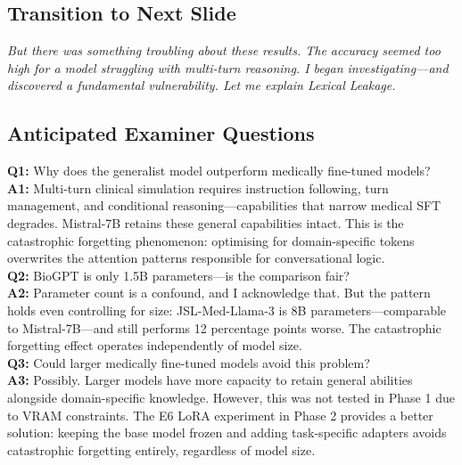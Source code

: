 \documentclass[12pt]{article}
\begin{document}
  \subsection*{Transition to Next Slide}
  {\color{transgreen}
  \textit{But there was something troubling about these results. The accuracy seemed too high for a model struggling with multi-turn reasoning. I began investigating---and discovered a fundamental vulnerability. Let me explain Lexical Leakage.}
  }

  \subsection*{Anticipated Examiner Questions}
  \begin{qabox}
  \textbf{Q1:} Why does the generalist model outperform medically fine-tuned models? \\
  \textbf{A1:} Multi-turn clinical simulation requires instruction following, turn management, and conditional reasoning---capabilities that narrow medical SFT degrades. Mistral-7B retains these general capabilities intact. This is the catastrophic forgetting phenomenon: optimising for domain-specific tokens overwrites the attention patterns responsible for conversational logic. \\[6pt]
  \textbf{Q2:} BioGPT is only 1.5B parameters---is the comparison fair? \\
  \textbf{A2:} Parameter count is a confound, and I acknowledge that. But the pattern holds even controlling for size: JSL-Med-Llama-3 is 8B parameters---comparable to Mistral-7B---and still performs 12 percentage points worse. The catastrophic forgetting effect operates independently of model size. \\[6pt]
  \textbf{Q3:} Could larger medically fine-tuned models avoid this problem? \\
  \textbf{A3:} Possibly. Larger models have more capacity to retain general abilities alongside domain-specific knowledge. However, this was not tested in Phase 1 due to VRAM constraints. The E6 LoRA experiment in Phase 2 provides a better solution: keeping the base model frozen and adding task-specific adapters avoids catastrophic forgetting entirely, regardless of model size.
  \end{qabox}



\end{document}
